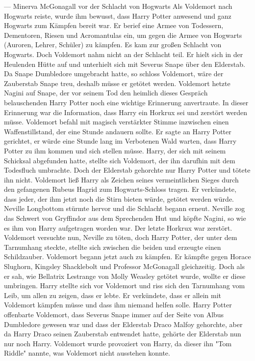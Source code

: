\documentclass[a4paper, 10pt]{article}
\begin{document}
— Minerva McGonagall vor der Schlacht von Hogwarts
\vspace{10pt}
\newline
Als Voldemort nach Hogwarts reiste, wurde ihm bewusst, dass Harry Potter anwesend und ganz Hogwarts zum Kämpfen bereit war. Er berief eine Armee von Todessern, Dementoren, Riesen und Acromantulas ein, um gegen die Armee von Hogwarts (Auroren, Lehrer, Schüler) zu kämpfen. Es kam zur großen Schlacht von Hogwarts. Doch Voldemort nahm nicht an der Schlacht teil. Er hielt sich in der Heulenden Hütte auf und unterhielt sich mit Severus Snape über den Elderstab. Da Snape Dumbledore umgebracht hatte, so schloss Voldemort, wäre der Zauberstab Snape treu, deshalb müsse er getötet werden. Voldemort hetzte Nagini auf Snape, der vor seinem Tod den heimlich dieses Gespräch belauschenden Harry Potter noch eine wichtige Erinnerung anvertraute. In dieser Erinnerung war die Information, dass Harry ein Horkrux sei und zerstört werden müsse. Voldemort befahl mit magisch verstärkter Stimme inzwischen einen Waffenstillstand, der eine Stunde andauern sollte. Er sagte an Harry Potter gerichtet, er würde eine Stunde lang im Verbotenen Wald warten, dass Harry Potter zu ihm kommen und sich stellen müsse. Harry, der sich mit seinem Schicksal abgefunden hatte, stellte sich Voldemort, der ihn darufhin mit dem Todesfluch umbrachte. Doch der Elderstab gehorchte nur Harry Potter und tötete ihn nicht. Voldemort ließ Harry als Zeichen seines vermeintlichen Sieges durch den gefangenen Rubeus Hagrid zum Hogwarts-Schloss tragen. Er verkündete, dass jeder, der ihm jetzt noch die Stirn bieten würde, getötet werden würde. Neville Longbottom stürmte hervor und die Schlacht begann erneut. Neville zog das Schwert von Gryffindor aus dem Sprechenden Hut und köpfte Nagini, so wie es ihm von Harry aufgetragen worden war. Der letzte Horkrux war zerstört. Voldemort versuchte nun, Neville zu töten, doch Harry Potter, der unter dem Tarnumhang steckte, stellte sich zwischen die beiden und erzeugte einen Schildzauber. Voldemort begann jetzt auch zu kämpfen. Er kämpfte gegen Horace Slughorn, Kingsley Shacklebolt und Professor McGonagall gleichzeitig. Doch als er sah, wie Bellatrix Lestrange von Molly Weasley getötet wurde, wollte er diese umbringen. Harry stellte sich vor Voldemort und riss sich den Tarnumhang vom Leib, um allen zu zeigen, dass er lebte. Er verkündete, dass er allein mit Voldemort kämpfen müsse und dass ihm niemand helfen solle.
\vspace{10pt}
\newline
Harry Potter offenbarte Voldemort, dass Severus Snape immer auf der Seite von Albus Dumbledore gewesen war und dass der Elderstab Draco Malfoy gehorchte, aber da Harry Draco seinen Zauberstab entwendet hatte, gehörte der Elderstab nun nur noch Harry. Voldemort wurde provoziert von Harry, da dieser ihn "Tom Riddle" nannte, was Voldemort nicht ausstehen konnte.
\end{document}
